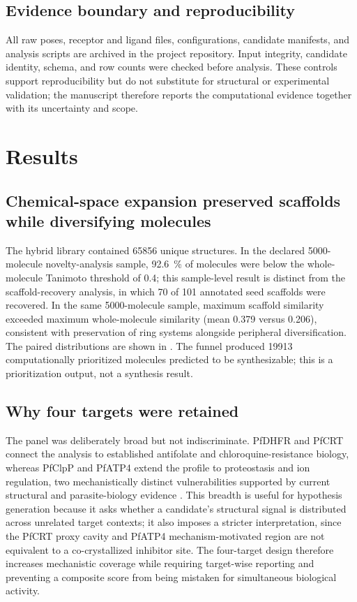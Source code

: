 \documentclass[journal=jcisd8,manuscript=article]{achemso}
\begin{document}
\subsection{Evidence boundary and reproducibility}
All raw poses, receptor and ligand files, configurations, candidate manifests, and analysis scripts are archived in the project repository. Input integrity, candidate identity, schema, and row counts were checked before analysis. These controls support reproducibility but do not substitute for structural or experimental validation; the manuscript therefore reports the computational evidence together with its uncertainty and scope.

\section{Results}
\subsection{Chemical-space expansion preserved scaffolds while diversifying molecules}
The hybrid library contained \num{65856} unique structures. In the declared \num{5000}-molecule novelty-analysis sample, \qty{92.6}{\percent} of molecules were below the whole-molecule Tanimoto threshold of \num{0.4}; this sample-level result is distinct from the scaffold-recovery analysis, in which \num{70} of \num{101} annotated seed scaffolds were recovered. In the same \num{5000}-molecule sample, maximum scaffold similarity exceeded maximum whole-molecule similarity (mean \num{0.379} versus \num{0.206}), consistent with preservation of ring systems alongside peripheral diversification. The paired distributions are shown in . The funnel produced \num{19913} computationally prioritized molecules predicted to be synthesizable; this is a prioritization output, not a synthesis result.

\subsection{Why four targets were retained}
The panel was deliberately broad but not indiscriminate. PfDHFR and PfCRT connect the analysis to established antifolate and chloroquine-resistance biology, whereas PfClpP and PfATP4 extend the profile to proteostasis and ion regulation, two mechanistically distinct vulnerabilities supported by current structural and parasite-biology evidence \cite{Tissawak2025,Haile2025}. This breadth is useful for hypothesis generation because it asks whether a candidate's structural signal is distributed across unrelated target contexts; it also imposes a stricter interpretation, since the PfCRT proxy cavity and PfATP4 mechanism-motivated region are not equivalent to a co-crystallized inhibitor site. The four-target design therefore increases mechanistic coverage while requiring target-wise reporting and preventing a composite score from being mistaken for simultaneous biological activity.
\end{document}
